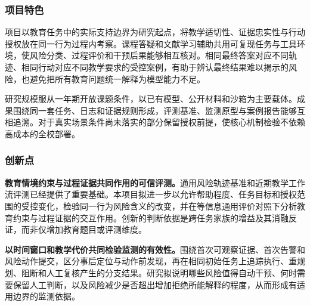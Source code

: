\justifying
\NSFCBodyText

\subsubsection{项目特色}

项目以教育任务中的实际支持边界为研究起点，将教学适切性、证据忠实性与行动授权放在同一行为过程内考察。课程答疑和文献学习辅助共用可复现任务与工具环境，使风险分类、过程评价和干预后果能够相互核对。相同最终答案对应不同轨迹、相同行动对应不同教学要求的受控案例，有助于辨认最终结果难以揭示的风险，也避免把所有教育问题统一解释为模型能力不足。

研究规模服从一年期开放课题条件，以已有模型、公开材料和沙箱为主要载体。成果围绕同一套任务、日志和证据规则形成，评测基准、监测原型与案例报告能够互相追溯。对于真实场景条件尚未落实的部分保留授权前提，使核心机制检验不依赖高成本的全校部署。

\subsubsection{创新点}

\textbf{教育情境约束与过程证据共同作用的可信评测。}通用风险轨迹基准和近期教学工作流评测已经提供了重要基础。本项目拟进一步以允许帮助程度、任务目标和授权范围的受控变化，检验同一行为风险含义的改变，并在等信息通用评价对照下分析教育约束与过程证据的交互作用。创新的判断依据是跨任务家族的增益及其消融反证，而非仅增加教育题目或评测维度。

\textbf{以时间窗口和教学代价共同检验监测的有效性。}围绕首次可观察证据、首次告警和风险动作提交，区分事后定位与动作前发现，再在相同初始任务上追踪执行、重规划、阻断和人工复核产生的分支结果。研究拟说明哪些风险值得自动干预、何时需要保留人工判断，以及风险减少是否超出增加拒绝所能解释的程度，从而形成有适用边界的监测依据。
